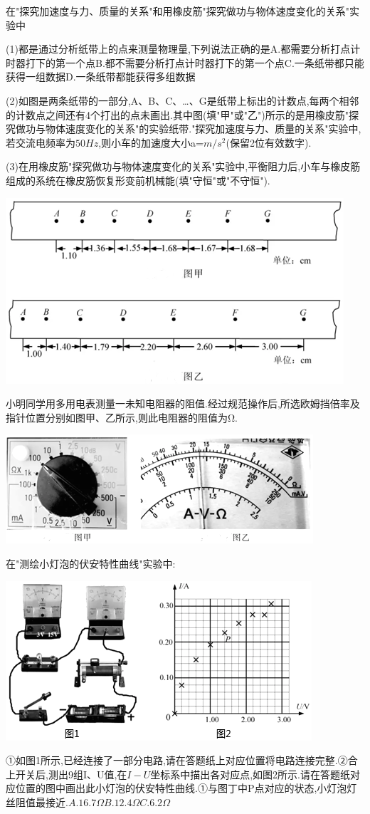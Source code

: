 \question[6] 在"探究加速度与力、质量的关系"和用橡皮筋"探究做功与物体速度变化的关系"实验中

(1)都是通过分析纸带上的点来测量物理量,下列说法正确的是\key{}A.都需要分析打点计时器打下的第一个点B.都不需要分析打点计时器打下的第一个点C.一条纸带都只能获得一组数据D.一条纸带都能获得多组数据

(2)如图是两条纸带的一部分,A、B、C、…、G是纸带上标出的计数点,每两个相邻的计数点之间还有4个打出的点未画出.其中图\key{}(填"甲"或"乙")所示的是用橡皮筋"探究做功与物体速度变化的关系"的实验纸带."探究加速度与力、质量的关系"实验中,若交流电频率为$50Hz$,则小车的加速度大小a=\key{}$m/s^2$(保留2位有效数字).

(3)在用橡皮筋"探究做功与物体速度变化的关系"实验中,平衡阻力后,小车与橡皮筋组成的系统在橡皮筋恢复形变前机械能\key{}(填"守恒"或"不守恒").\begin{center}\includegraphics[]{img/image14.png}\end{center}
\question[6] 小明同学用多用电表测量一未知电阻器的阻值.经过规范操作后,所选欧姆挡倍率及指针位置分别如图甲、乙所示,则此电阻器的阻值为\key{}Ω.\begin{center}\includegraphics[]{img/image15.png}\end{center}
\question[6] 在"测绘小灯泡的伏安特性曲线"实验中:\begin{center}\includegraphics[]{img/image16.png}\end{center}①如图1所示,已经连接了一部分电路,请在答题纸上对应位置将电路连接完整.②合上开关后,测出9组I、U值,在$I-U$坐标系中描出各对应点,如图2所示.请在答题纸对应位置的图中画出此小灯泡的伏安特性曲线.①与图丁中P点对应的状态,小灯泡灯丝阻值最接近\key{}$.A.16.7ΩB.12.4ΩC.6.2Ω$

